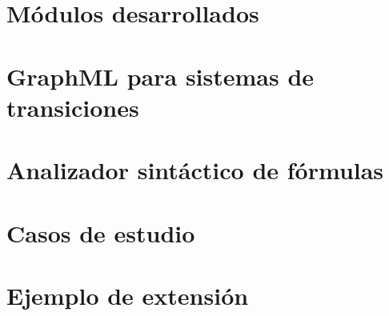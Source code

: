 



\section{Módulos desarrollados}


\section{GraphML para sistemas de transiciones}


\section{Analizador sintáctico de fórmulas}
\label{sec:ply}


\section{Casos de estudio}


\section{Ejemplo de extensión}\label{cap:extension}
